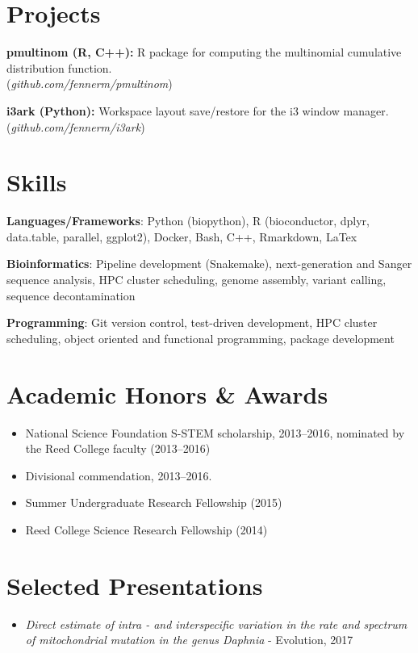 \documentclass {article}
\newenvironment{lItemize} {
   \begin{itemize}%
      \setlength{\itemsep}{0pt}%
      \setlength{\topsep}{0pt}
      \setlength{\partopsep}{0pt}
      \setlength{\parsep}{0pt}
      \setlength{\parskip}{0pt}%
      \vspace{2mm}
} {\end{itemize}}
\newcommand{\link}[1]{(\textit{#1})}
\newcommand{\project}[3]{\item \textbf{#1 (#2):} #3}
\newcommand{\skill}[2]{\item \textbf{#1}: #2}
\begin{document}
\section*{Projects}
\project{pmultinom}{R, C++} {R package for computing the multinomial
cumulative distribution function. \\\link{github.com/fennerm/pmultinom}}
\project{i3ark}{Python} {Workspace layout save/restore for the i3
window manager. \\\link{github.com/fennerm/i3ark}}

\section*{Skills}
\skill{Languages/Frameworks} {Python (biopython), R (bioconductor, dplyr,
data.table, parallel, ggplot2), Docker, Bash, C++, Rmarkdown, LaTex}
\skill{Bioinformatics}{Pipeline development (Snakemake), next-generation
   and Sanger sequence analysis, HPC cluster scheduling, genome assembly,
variant calling, sequence decontamination}
\skill{Programming}{Git version control, test-driven development, HPC cluster
scheduling, object oriented and functional programming, package development}

\section*{Academic Honors \& Awards}
\begin{lItemize}
\item National Science Foundation S-STEM scholarship, 2013--2016, nominated
   by the Reed College faculty (2013--2016)
\item Divisional commendation, 2013--2016.
\item Summer Undergraduate Research Fellowship (2015)
\item Reed College Science Research Fellowship (2014)
\end{lItemize}

\section*{Selected Presentations}
\begin{lItemize}
\item{\textit{Direct estimate of intra - and interspecific variation in the
      rate and spectrum of mitochondrial mutation in the genus Daphnia}
   - Evolution, 2017}
\end{lItemize}
\end{document}
